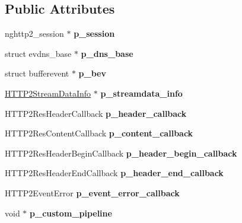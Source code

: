 \subsection*{Public Attributes}
\begin{DoxyCompactItemize}
\item 
\mbox{\label{classhttp2_1_1HTTP2SessionInfo_a3ea2596d897ee9bb8420cf73bc9773a9}} 
nghttp2\+\_\+session $\ast$ {\bfseries p\+\_\+session}
\item 
\mbox{\label{classhttp2_1_1HTTP2SessionInfo_af0fd22ee85afcb8ff05ed4c7c9b35409}} 
struct evdns\+\_\+base $\ast$ {\bfseries p\+\_\+dns\+\_\+base}
\item 
\mbox{\label{classhttp2_1_1HTTP2SessionInfo_a9731240a0ea312b74f69a483fa321d56}} 
struct bufferevent $\ast$ {\bfseries p\+\_\+bev}
\item 
\mbox{\label{classhttp2_1_1HTTP2SessionInfo_a8fda2ef70b5590d812e4bf5143f2c3d4}} 
\hyperlink{classhttp2_1_1HTTP2StreamDataInfo}{H\+T\+T\+P2\+Stream\+Data\+Info} $\ast$ {\bfseries p\+\_\+streamdata\+\_\+info}
\item 
\mbox{\label{classhttp2_1_1HTTP2SessionInfo_ad06485158d17b1f0fcadd4b2a84d986a}} 
H\+T\+T\+P2\+Res\+Header\+Callback {\bfseries p\+\_\+header\+\_\+callback}
\item 
\mbox{\label{classhttp2_1_1HTTP2SessionInfo_a352c0b72f553f0a258d45a5e116a9d75}} 
H\+T\+T\+P2\+Res\+Content\+Callback {\bfseries p\+\_\+content\+\_\+callback}
\item 
\mbox{\label{classhttp2_1_1HTTP2SessionInfo_af4f63e69e669a60aff1d9ffb65fbf623}} 
H\+T\+T\+P2\+Res\+Header\+Begin\+Callback {\bfseries p\+\_\+header\+\_\+begin\+\_\+callback}
\item 
\mbox{\label{classhttp2_1_1HTTP2SessionInfo_a3f57bc3f144417146fc2f3bb64936530}} 
H\+T\+T\+P2\+Res\+Header\+End\+Callback {\bfseries p\+\_\+header\+\_\+end\+\_\+callback}
\item 
\mbox{\label{classhttp2_1_1HTTP2SessionInfo_a5873871249389b308f86e9ea692d5fcf}} 
H\+T\+T\+P2\+Event\+Error {\bfseries p\+\_\+event\+\_\+error\+\_\+callback}
\item 
\mbox{\label{classhttp2_1_1HTTP2SessionInfo_a003e07903edd5c7ca88d4c35126bdd6c}} 
void $\ast$ {\bfseries p\+\_\+custom\+\_\+pipeline}
\end{DoxyCompactItemize}


